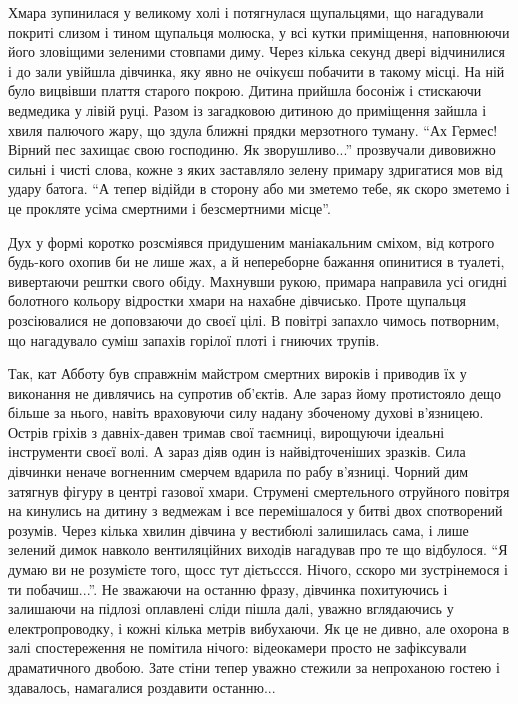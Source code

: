 \documentclass[a4paper,oneside]{book}
\begin{document}
Хмара зупинилася у великому холі і потягнулася щупальцями, що нагадували
покриті слизом і тином щупальця  молюска, у всі кутки приміщення, наповнюючи
його зловіщими зеленими стовпами диму. Через кілька секунд двері відчинилися і
до зали увійшла дівчинка, яку явно не очікуєш побачити в такому місці. На ній
було вицвівши плаття старого покрою. Дитина прийшла босоніж і стискаючи
ведмедика у лівій руці. Разом із загадковою дитиною до приміщення зайшла і
хвиля палючого жару, що здула ближні прядки мерзотного туману. “Ах Гермес!
Вірний пес захищає свою господиню. Як зворушливо...” прозвучали дивовижно
сильні і чисті слова, кожне з яких заставляло зелену примару здригатися мов
від удару батога. “А тепер відійди в сторону або ми зметемо тебе, як скоро
зметемо і це прокляте усіма смертними і безсмертними місце”.

Дух у формі коротко розсміявся придушеним маніакальним сміхом, від котрого
будь-кого охопив би не лише жах, а й непереборне бажання опинитися в туалеті,
вивертаючи рештки свого обіду. Махнувши рукою, примара направила усі огидні
болотного кольору відростки хмари на нахабне дівчисько. Проте щупальця
розсіювалися не доповзаючи до своєї цілі. В повітрі запахло чимось потворним,
що нагадувало суміш запахів горілої плоті і гниючих трупів.

Так, кат Абботу був справжнім майстром смертних вироків і приводив їх у
виконання не дивлячись на супротив об’єктів. Але зараз йому протистояло дещо
більше за нього, навіть враховуючи силу надану збоченому духові
в’язницею. Острів гріхів з давніх-давен тримав свої таємниці, вирощуючи
ідеальні інструменти своєї волі. А зараз діяв один із найвідточеніших
зразків. Сила дівчинки неначе вогненним смерчем вдарила по рабу
в’язниці. Чорний дим затягнув фігуру в центрі газової хмари. Струмені
смертельного отруйного повітря на кинулись на  дитину з ведмежам і все
перемішалося у битві двох спотворений розумів. Через  кілька хвилин дівчина у
вестибюлі залишилась сама, і лише зелений димок навколо вентиляційних виходів
нагадував про те що відбулося. “Я думаю ви не розумієте того, щосс тут
дієтьссся. Нічого, сскоро ми зустрінемося і ти побачиш...”. Не зважаючи на
останню фразу, дівчинка похитуючись і залишаючи на підлозі оплавлені сліди
пішла далі, уважно вглядаючись у електропроводку, і кожні кілька метрів
вибухаючи. Як це не дивно, але охорона в залі спостереження не помітила
нічого: відеокамери просто не зафіксували драматичного двобою. Зате стіни
тепер уважно стежили за непроханою гостею і здавалось, намагалися роздавити
останню...
\end{document}
